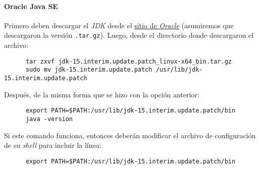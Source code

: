   \paragraph{Oracle Java SE}
    Primero deben descargar el \textit{JDK} desde el
    \href{https://www.oracle.com/java/technologies/javase-jdk15-downloads.html}{sitio de 
    \textit{Oracle}} (asumiremos que descargaron la versión \texttt{.tar.gz}).
    Luego, desde el directorio donde descargaron el archivo:

    \begin{verbatim}
      tar zxvf jdk-15.interim.update.patch_linux-x64_bin.tar.gz
      sudo mv jdk-15.interim.update.patch /usr/lib/jdk-15.interim.update.patch
    \end{verbatim}

    Después, de la misma forma que se hizo con la opción anterior:
    
    \begin{verbatim}
      export PATH=$PATH:/usr/lib/jdk-15.interim.update.patch/bin
      java -version
    \end{verbatim}

    Si este comando funciona, entonces deberán modificar el archivo de configuración de su
    \textit{shell} para incluir la línea:

    \begin{verbatim}
      export PATH=$PATH:/usr/lib/jdk-15.interim.update.patch/bin
    \end{verbatim}